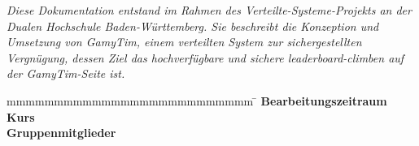 \begin{titlepage}
\begin{center}
	  \begin{center}
  \textit{Diese Dokumentation entstand im Rahmen des Verteilte-Systeme-Projekts 
  an der Dualen Hochschule Baden-Württemberg. 
  Sie beschreibt die Konzeption und Umsetzung von GamyTim, einem verteilten System zur sichergestellten Vergnügung, 
  dessen Ziel das hochverfügbare und sichere leaderboard-climben auf der GamyTim-Seite ist.}
\end{center}
	\end{center}
	\vfill
	\begin{spacing}{1.2}
	\begin{tabbing}
		mmmmmmmmmmmmmmmmmmmmmmmmmm     \= \kill
		\textbf{Bearbeitungszeitraum}  \>  \zeitraum\\
		\textbf{Kurs}  					\> \kurs\\
		\textbf{Gruppenmitglieder}      \>  \firma\\
	\end{tabbing}
	\end{spacing}
\end{titlepage}
